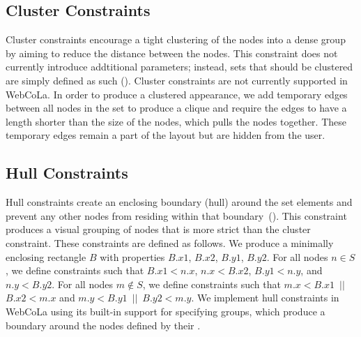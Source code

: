 \subsection{Cluster Constraints}
Cluster constraints encourage a tight clustering of the nodes into a dense group by
aiming to reduce the distance between the nodes. This constraint does not
currently introduce addtitional parameters; instead, sets that should be
clustered are simply defined as such ().
Cluster constraints are not currently supported in WebCoLa. In order to
produce a clustered appearance, we add temporary edges between all nodes
in the set to produce a clique and require the edges to have a length shorter
than the size of the nodes, which pulls the nodes together. These temporary edges
remain a part of the layout but are hidden from the user.

\subsection{Hull Constraints}
Hull constraints create an enclosing boundary (hull) around the set elements and 
prevent any other nodes from residing within that 
boundary~(). 
This constraint produces a visual grouping of nodes that is more strict than the cluster constraint.
These constraints are defined as follows. We produce a minimally enclosing rectangle 
$B$ with properties $B.x1$, $B.x2$, $B.y1$, $B.y2$. For all nodes
$n \in S$, we define constraints such that $B.x1 < n.x$, \mbox{$n.x < B.x2$},
$B.y1 < n.y$, and $n.y < B.y2$. For all nodes $m \notin S$, we define
constraints such that \mbox{$m.x < B.x1$ $||$ $B.x2 < m.x$} and \mbox{$m.y < B.y1$ $||$ $B.y2 < m.y$}.
We implement hull constraints in WebCoLa using its built-in support for 
specifying groups, which produce a boundary around 
the nodes defined by their .


\vspace{-10px}
